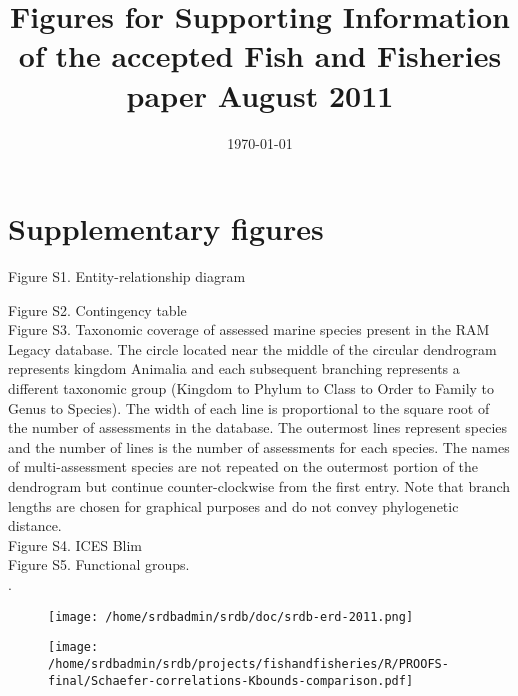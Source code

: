 \documentclass[letterpaper,review,authoryear,12pt]{article}
\title{Figures for Supporting Information of the accepted Fish and Fisheries paper August 2011}
\date{\today}
\begin{document}
\renewcommand{\figurename}{Fig. S}
\renewcommand{\tablename}{Table S}

\maketitle

\section{Supplementary figures}
\noindent Figure S1. Entity-relationship diagram


\noindent Figure S2. Contingency table\\ 

\noindent Figure S3. Taxonomic coverage of assessed marine species
present in the RAM Legacy database. The circle located near the middle
of the circular dendrogram represents kingdom Animalia and each
subsequent branching represents a different taxonomic group (Kingdom
to Phylum to Class to Order to Family to Genus to Species). The width
of each line is proportional to the square root of the number of
assessments in the database. The outermost lines represent species and
the number of lines is the number of assessments for each species. The
names of multi-assessment species are not repeated on the outermost
portion of the dendrogram but continue counter-clockwise from the
first entry.  Note that branch lengths are chosen for graphical
purposes and do not convey phylogenetic distance.\\

\noindent Figure S4. ICES Blim\\ 

\noindent Figure S5. Functional groups.\\ 


.\begin{figure}
\begin{center}
\texttt{[image: /home/srdbadmin/srdb/doc/srdb-erd-2011.png]}
\end{center}
\caption{ }\label{fig:erd}
\end{figure}

\begin{figure}
\begin{center}
\texttt{[image: /home/srdbadmin/srdb/projects/fishandfisheries/R/PROOFS-final/Schaefer-correlations-Kbounds-comparison.pdf]}
\end{center}
\caption{ }\label{fig:corr}
\end{figure}
\end{document}
